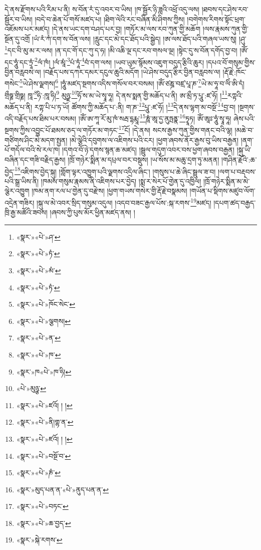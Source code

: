 དེ་ནས་རྫོགས་པའི་རིམ་པ་ནི། ས་བོན་རཾ་དུ་འབར་བ་ཡིས། །ཁ་སྦྱོར་ཉི་ཟླའི་འཕྲོ་འདུ་ལས། །ཐབས་དང་ཤེས་རབ་སྦྱོར་བ་ཡིས། །བདེ་བ་ཆེན་པོ་གསོ་མཛད་པ། །ཐིག་ལེའི་རང་བཞིན་མི་ཤིགས་ཀྱིས། །བགེགས་རིགས་སྟོང་ཕྲག་འཇོམས་པར་མཛད། །དེ་ནས་ཡང་དག་བཤད་པར་བྱ། །གཏོར་མ་ལས་རབ་ཀུན་གྱི་མཆོག །ལས་རྣམས་ཀུན་གྱི་སྔོན་དུ་འགྲོ །ཡཾ་རཾ་ཀཾ་དག་ས་བོན་ལས། །རླུང་དང་མེ་དང་ཐོད་པའི་སྒྱེད། །ཨ་ལས་ཐོད་པའི་གཞལ་ཡས་སུ། །ཤུ་\footnote{«སྣར་»«པེ་»ཤ་}དང་བི་མུ་མ་ར་ལས། །ན་དང་གོ་དང་ཀུ་ད་ཧ། །མི་འཆི་ལྔ་དང་རབ་གསལ་ལྔ། །སྟེང་དུ་ས་བོན་དགོད་བྱ་བ། །ཨོཾ་དང་ཧཱུཾ་དང་ཏྲཱཾ་\footnote{«སྣར་»«པེ་»ཏཾ་}ལཾ་ཁཾ། །ལཾ་མཱཾ་\footnote{«སྣར་»«པེ་»མཾ་}པཾ་ཏཱཾ་\footnote{«སྣར་»«པེ་»ཏཾ་}བཾ་དག་ལས། །ཡབ་ཡུམ་སྙོམས་འཇུག་བདུད་རྩིའི་ཆུར། །དཔའ་བོ་གསུམ་གྱིས་བྱིན་བརླབས་ལ། །བརྗོད་པས་དཀར་དམར་དངུལ་ཆུའི་མདོག །ཡེ་ཤེས་བདུད་རྩིར་བྱིན་བརླབས་ལ། །རྡོ་རྗེ་:ཁོང་གསེང་\footnote{«སྣར་»«པེ་»ཁོང་སེང་}ཡེ་ཤེས་ལྗགས།\footnote{«སྣར་»«པེ་»ལྕགས།} །ཧཱུཾ་མཛད་སྔགས་འདིས་གསོལ་བར་བསམ། །ཨོཾ་ཙཎྜ་བཛྲ་པཱ་ཎ་\footnote{«སྣར་»«པེ་»ན་}ཡེ་མ་ཧཱ་བ་ལིཾ་ཨི་དཾ། གྲྀཧྞ་གྲིཧྞ། ཁཱ་\footnote{«སྣར་»«པེ་»ཁ་}ཧི་:ཁཱ་ཧི།\footnote{«སྣར་»ཁ«པེ་»ཁ་ཧི།} མུཉྫ་\footnote{«པེ་»མུཉྩ་}ཧོ་ས་མ་ཡེ་སྭཱ་ཧཱ། དེ་ནས་སྨན་གྱི་མཆོད་པ་ནི། ཨ་མྲྀ་ཏ་པཱུ་:ཛ་ཧོ། །\footnote{«སྣར་»«པེ་»ཛའོ། ། །}རཀྟའི་མཆོད་པ་ནི། རཀྟ་པི་པ་ཏ་ཡོ། ཚོགས་ཀྱི་མཆོད་པ་:ནི། ག་ཎ་\footnote{«སྣར་»«པེ་»ནི།གྷ་ན་}པཱུ་:ཛ་ཧོ། །\footnote{«སྣར་»«པེ་»ཛའོ། ། །}དེ་ནས་ལྷག་མ་བསྔོ་\footnote{«སྣར་»«པེ་»བསྔོ་བ་}བྱ་བ། །སྔགས་འདི་བརྗོད་པས་ཐིམ་པར་བསམ། །ཨོཾ་ཨ་ཀཱ་རོ་མུ་ཁཾ་སརྦ་དྷརྨཱ་\footnote{«སྣར་»«པེ་»ཎཾ་}ཎཱཾ་ཨཱ་དྱ་ནུཏྤནྣ་\footnote{«སྣར་»མུད་པན་ན་«པེ་»ནུད་པན་ན་}ཏྭཱཏ། ཨོཾ་ཨཱཿ་ཧཱུཾ་སྭཱ་ཧཱ། ཞེས་པའི་སྔགས་ཀྱིས་འབྱུང་པོ་ཐམས་ཅད་ལ་གཏོར་མ་གཏང་\footnote{«སྣར་»«པེ་»བཏང་}ངོ། །དེ་ནས། སངས་རྒྱས་ཀུན་གྱིས་གནང་བའི་ལྷ། །མཆེ་བ་གཙིགས་ཤིང་མེ་མདག་སྤྱན། །མེ་ལྕེའི་དབུགས་ལ་འཇིགས་པའི་ངར། །ཕྱག་ཞབས་ནོར་རྒྱས་བུ་ཡིས་བརྒྱན། །ནག་པོ་གདོལ་བའི་སེ་རལ་ཁ། །དགའ་བོ་ཉེ་དགས་སྙན་ཆ་མཛད། །སྦྲུལ་གདུག་འབར་བས་ཕྱག་ཞབས་བརྒྱན། །སྐུ་ཡི་བཞིན་དང་གཟི་བརྗིད་རྒྱས། །ཁྲོ་གཉེར་སྨིན་མ་དཔྲལ་བར་བསྡུས། །ཡ་སོས་མ་མཆུ་དྲག་ཏུ་མནན། །གཤིན་རྗེའི་:ཆ་བྱེད་\footnote{«སྣར་»«པེ་»ཆ་བྱད་}འཇིགས་བྱེད་སྐུ། །གློག་ལྟར་འཁྱུག་པའི་ལྗགས་འདྲིལ་ཞིང་། །གསུས་པ་ཆེ་ཞིང་སྦྲུལ་ཟ་བ། །ལག་པ་བརྡབས་པའི་སྒྲ་ཡིས་ནི། །ཁམས་གསུམ་རྣམས་ནི་འཇིགས་པར་བྱེད། །སྨ་ར་སེར་པོ་གྱེན་དུ་འཁྱིལ། །ཁྲོ་གཉེར་སྨིན་མ་མེ་ལྕེར་འཁྱུག །ཁམ་ནག་རལ་པ་གྱེན་དུ་བརྫེས། །ཕྱག་གཡས་གསེར་གྱི་རྡོ་རྗེ་བསྣམས། །གཡོན་པ་སྡིགས་མཛུབ་ལོག་འདྲེན་གཟིར། །སྐུ་ལ་མེ་འབར་སྲིད་གསུམ་འདུལ། །འདབ་བཟང་རྒྱལ་པོས་:སྐ་རགས་\footnote{«སྣར་»སྐེ་རགས་}མཛད། །དཔག་ཚད་བརྒྱད་ཁྲི་རྒྱ་མཚོའི་ཟབས། །ཞབས་ཀྱི་པུས་མོར་ཕྱིན་མཛད་ནས། །
